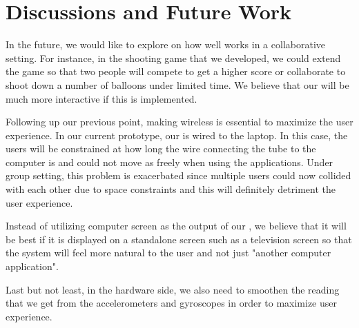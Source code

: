 \section{Discussions and Future Work}\label{sec:fut-work}
In the future, we would like to explore on how well \tube works in a collaborative setting. For instance, in the shooting game that we developed, we could extend the game so that two people will compete to get a higher score or collaborate to shoot down a number of balloons under limited time. We believe that our \tube will be much more interactive if this is implemented.

Following up our previous point, making \tube wireless is essential to maximize the user experience. In our current prototype, our \tube is wired to the laptop. In this case, the users will be constrained at how long the wire connecting the tube to the computer is and could not move as freely when using the applications. Under group setting, this problem is exacerbated since multiple users could now collided with each other due to space constraints and this will definitely detriment the user experience.

Instead of utilizing computer screen as the output of our \tube, we believe that it will be best if it is displayed on a standalone screen such as a television screen so that the \tube system will feel more natural to the user and not just "another computer application".

Last but not least, in the hardware side, we also need to smoothen the reading that we get from the accelerometers and gyroscopes in order to maximize user experience.

